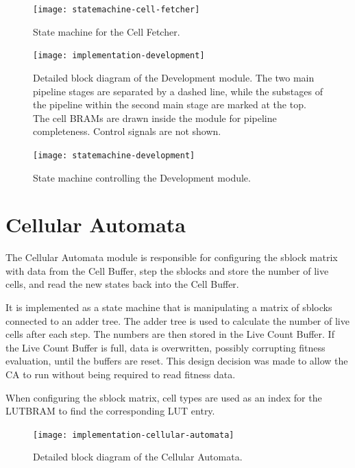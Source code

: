 \begin{figure}[!ht]
    \centering
    \texttt{[image: statemachine-cell-fetcher]}
    \caption[Cell Fetcher state machine]{
        State machine for the Cell Fetcher.
    }
    \label{fig:implementation-cell-fetcher}
\end{figure}

\begin{figure}[!ht]
    \centering
    \texttt{[image: implementation-development]}
    \caption[Development module]{
        Detailed block diagram of the Development module.
        The two main pipeline stages are separated by a dashed line,
        while the substages of the pipeline within the second main stage are marked at the top.
        The cell BRAMs are drawn inside the module for pipeline completeness.
        Control signals are not shown.
    }
    \label{fig:implementation-development}
\end{figure}

\begin{figure}[!ht]
    \centering
    \texttt{[image: statemachine-development]}
    \caption[Development module state machine]{
        State machine controlling the Development module.
    }
    \label{fig:statemachine-development}
\end{figure}

\section{Cellular Automata}

The Cellular Automata module is responsible for configuring the sblock matrix with data from the Cell Buffer, step the sblocks and store the number of live cells, and read the new states back into the Cell Buffer.

It is implemented as a state machine that is manipulating a matrix of sblocks connected to an adder tree.
The adder tree is used to calculate the number of live cells after each step.
The numbers are then stored in the Live Count Buffer.
If the Live Count Buffer is full, data is overwritten, possibly corrupting fitness evaluation, until the buffers are reset.
This design decision was made to allow the CA to run without being required to read fitness data.

When configuring the sblock matrix, cell types are used as an index for the LUTBRAM to find the corresponding LUT entry.

\begin{figure}[!ht]
    \centering
    \texttt{[image: implementation-cellular-automata]}
    \caption[Cellular Automata]{
        Detailed block diagram of the Cellular Automata.
    }
    \label{fig:implementation-cellular-automata}
\end{figure}

